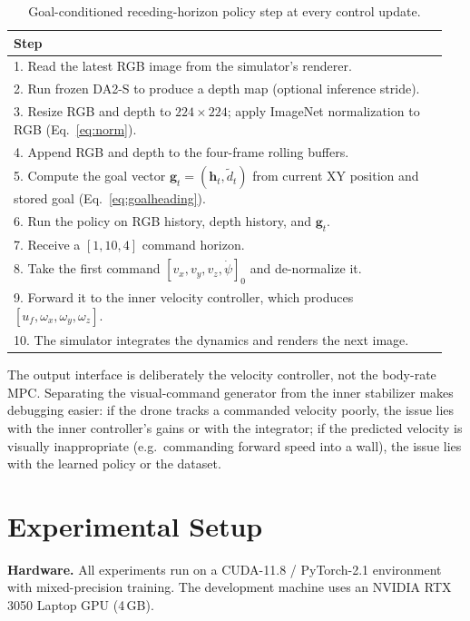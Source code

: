 \documentclass[10pt,twocolumn,letterpaper]{article}
\begin{document}
\begin{table}[t]
\centering
\caption{Goal-conditioned receding-horizon policy step at every control update.}
\label{tab:runtime}
\small
\begin{tabular}{@{}p{0.95\linewidth}@{}}
\toprule
\textbf{Step} \\
\midrule
1. Read the latest RGB image from the simulator's renderer. \\
2. Run frozen DA2-S to produce a depth map (optional inference stride). \\
3. Resize RGB and depth to $224\times224$; apply ImageNet normalization to RGB (Eq.~\ref{eq:norm}). \\
4. Append RGB and depth to the four-frame rolling buffers. \\
5. Compute the goal vector $\mathbf{g}_t = (\mathbf{h}_t, \tilde{d}_t)$ from current XY position and stored goal (Eq.~\ref{eq:goalheading}). \\
6. Run the policy on RGB history, depth history, and $\mathbf{g}_t$. \\
7. Receive a $[1,10,4]$ command horizon. \\
8. Take the first command $[v_x, v_y, v_z, \dot{\psi}]_0$ and de-normalize it. \\
9. Forward it to the inner velocity controller, which produces $[u_f, \omega_x, \omega_y, \omega_z]$. \\
10. The simulator integrates the dynamics and renders the next image. \\
\bottomrule
\end{tabular}
\end{table}

The output interface is deliberately the velocity controller, not the body-rate MPC. Separating the visual-command generator from the inner stabilizer makes debugging easier: if the drone tracks a commanded velocity poorly, the issue lies with the inner controller's gains or with the integrator; if the predicted velocity is visually inappropriate (e.g.~commanding forward speed into a wall), the issue lies with the learned policy or the dataset.

\section{Experimental Setup}
\label{sec:experimental}

\textbf{Hardware.} All experiments run on a CUDA-11.8 / PyTorch-2.1 environment with mixed-precision training. The development machine uses an NVIDIA RTX 3050 Laptop GPU (4\,GB).
\end{document}

